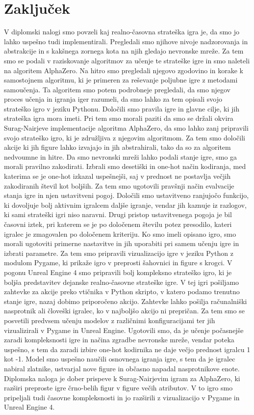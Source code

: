 \documentclass[a4paper, 12pt]{book}
\begin{document}
\chapter{Zaključek}
\label{chzakljucek}
V diplomski nalogi smo povzeli kaj realno-časovna strateška igra je, da smo jo lahko uspešno tudi implementirali.
Pregledali smo njihove nivoje nadzorovanja in abstrakcije in s kakšnega zornega kota na njih gledajo nevronske mreže.
Za tem smo se podali v raziskovanje algoritmov za učenje te strateške igre in smo naleteli na algoritem AlphaZero.
Na hitro smo pregledali njegovo zgodovino in korake k samostojnem algoritmu, ki je primeren za reševanje poljubne igre z metodami samoučenja.
Ta algoritem smo potem podrobneje pregledali, da smo njegov proces učenja in igranja iger razumeli, da smo lahko za tem opisali svojo strateško igro v jeziku Pythonu.
Določili smo pravila igre in glavne cilje, ki jih strateška igra mora imeti.
Pri tem smo morali paziti da smo se držali okvira Surag-Nairjeve implementacije algoritma AlphaZero, da smo lahko zanj pripravili svojo strateško igro, ki je združljiva z njegovim algoritmom.
Za tem smo določili akcije ki jih figure lahko izvajajo in jih abstrahirali, tako da so za algoritem nedvoumne in hitre.
Da smo nevronski mreži lahko podali stanje igre, smo ga morali pravilno zakodirati.
Izbrali smo desetiški in one-hot način kodiranja, med katerima se je one-hot izkazal uspešnejši, saj v prednost ne postavlja večjih zakodiranih števil kot boljših.
Za tem smo ugotovili pravšnji način evalvacije stanja igre in njen ustavitveni pogoj.
Določili smo ustavitveno ranjujočo funkcijo, ki dovoljuje bolj aktivnim igralcem daljše igranje, vendar jih kaznuje iz razlogov, ki sami strateški igri niso naravni.
Drugi pristop ustavitvenega pogoja je bil časovni iztek, pri katerem se je po določenem številu potez presodilo, kateri igralec je zmagovalen po določenem kriteriju.
Ko smo imeli opisano igro, smo morali ugotoviti primerne nastavitve in jih uporabiti pri samem učenju igre in izbrati parametre.
Za tem smo pripravili vizualizacijo igre v jeziku Python z modulom Pygame, ki prikaže igro v preprosti šahovnici in figure s krogci.
V pogonu Unreal Engine 4 smo pripravili bolj kompleksno strateško igro, ki je boljša predstavitev dejanske realno-časovne strateške igre.
V tej igri pošiljamo zahtevke za akcije preko vtičnika v Python skripto, v katero podamo trenutno stanje igre, nazaj dobimo priporočeno akcijo.
Zahtevke lahko pošilja računalniški nasprotnik ali človeški igralec, ko v najboljšo akcijo ni prepričan.
Za tem smo se posvetili predvsem učenju modelov z različnimi konfiguracijami ter jih vizualizirali v Pygame in Unreal Engine.
Ugotovili smo, da je učenje počasnejše zaradi kompleksnosti igre in načina zgradbe nevronske mreže, vendar poteka uspešno, s tem da zaradi izbire one-hot kodirnika ne daje večjo prednost igralcu 1 kot -1.
Model smo uspešno naučili osnovnega igranja igre, s tem da je igralec nabiral zlatnike, ustvarjal nove figure in občasno napadal nasprotnikove enote.
Diplomska naloga je dober prispeve k Surag-Nairjevim igram za AlphaZero, ki razširi preproste igre črno-belih figur v figure večih atributov.
V to igro smo pripeljali tudi časovne kompleksnosti in jo razširili z vizualizacijo v Pygame in Unreal Engine 4.
\end{document}
